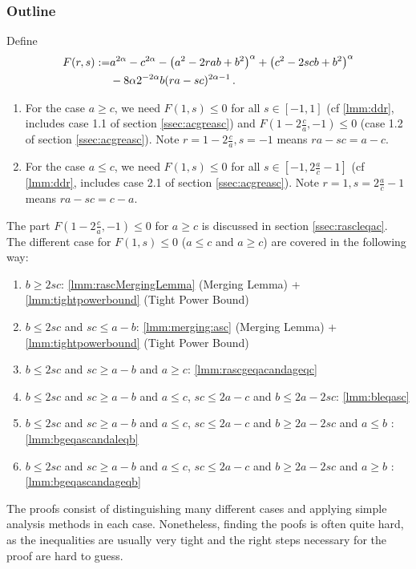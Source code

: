 \subsubsection{Outline}
%
\begin{remark}\label{rmk:outline}
	Define
	\begin{align*}
		F(r,s) 
		:= 
		&a^{2\alpha}-c^{2\alpha}-\left( a^2-2rab+b^2 \right)^\alpha+\left( c^2-2scb+b^2 \right)^\alpha 
		\\&-
		8 \alpha 2^{-2\alpha} b (ra - sc)^{2\alpha-1}
		\, .
	\end{align*}
	\begin{enumerate}[label=(\roman*)]
	\item 
		For the case $a\geq c$, we need $F(1,s) \leq 0$ for all $s\in[-1,1]$ (cf \autoref{lmm:ddr}, includes  case 1.1 of section \ref{ssec:acgreasc}) and $F(1-2\frac ca, -1) \leq 0$ (case 1.2 of section \ref{ssec:acgreasc}).
		Note $r= 1-2\frac ca, s=-1$ means $ra-sc = a-c$.
	\item	
		For the case $a \leq c$, we need $F(1,s) \leq 0$ for all $s\in[-1,2\frac ac-1]$  (cf \autoref{lmm:ddr}, includes case 2.1 of section \ref{ssec:acgreasc}).
		Note $r= 1, s=2\frac ac-1$ means $ra-sc = c-a$.
	\end{enumerate}
	The part $F(1-2\frac ca, -1) \leq 0$ for $a\geq c$ is discussed in section \ref{ssec:rascleqac}.
	The different case for $F(1,s) \leq 0$ ($a\leq c$ and $a\geq c$) are covered in the following way:
	\begin{enumerate}[label=(\alph*)]
	\item 
	$b \geq 2sc$: \autoref{lmm:rascMergingLemma} (Merging Lemma) + \autoref{lmm:tightpowerbound} (Tight Power Bound)
	\item
	$b \leq 2sc$ and $sc \leq a-b$: \autoref{lmm:merging:asc} (Merging Lemma) + \autoref{lmm:tightpowerbound} (Tight Power Bound)
	\item
	$b \leq 2sc$ and $sc \geq a-b$ and $a \geq c$: \autoref{lmm:rascgeqacandageqc} 
	\item 
	$b \leq 2sc$ and $sc \geq a-b$ and $a \leq c$, $sc \leq 2a-c$ and $b \leq 2a-2sc$: \autoref{lmm:bleqasc}
	\item
	$b \leq 2sc$ and $sc \geq a-b$ and $a \leq c$, $sc \leq 2a-c$ and $b \geq 2a-2sc$ and $a \leq b$ : \autoref{lmm:bgeqascandaleqb}
	\item
	$b \leq 2sc$ and $sc \geq a-b$ and $a \leq c$, $sc \leq 2a-c$ and $b \geq 2a-2sc$ and $a \geq b$ : \autoref{lmm:bgeqascandageqb}
	\end{enumerate}
\end{remark}
%
The proofs consist of distinguishing many different cases and applying simple analysis methods in each case.
Nonetheless, finding the poofs is often quite hard, as the inequalities are usually very tight and the right steps necessary for the proof are hard to guess. 

